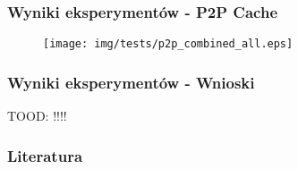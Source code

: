 \documentclass{beamer}
\begin{document}
\begin{frame}
\frametitle{Wyniki eksperymentów - P2P Cache}
\begin{figure}
\centering
\texttt{[image: img/tests/p2p\_combined\_all.eps]}
\end{figure}
\end{frame}

\begin{frame}
\frametitle{Wyniki eksperymentów - Wnioski}

TOOD: !!!!
\end{frame}


\begin{frame}[allowframebreaks]
\frametitle{Literatura}


\end{frame}
\end{document}
